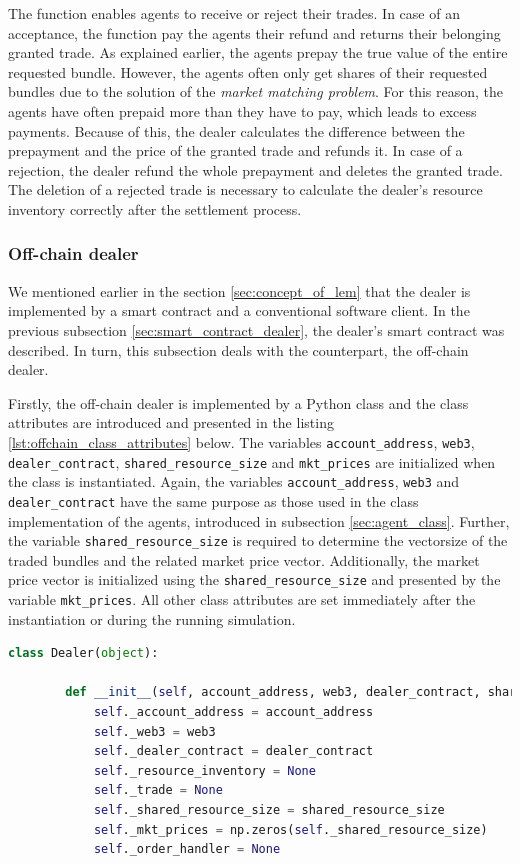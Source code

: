 The function enables agents to receive or reject their trades. 
In case of an acceptance, the function pay the agents their refund
and returns their belonging granted trade.
As explained earlier, the agents prepay the true value of the entire requested bundle.
However, the agents often only get shares of their requested bundles due to the solution of the 
\textit{market matching problem}.
For this reason, the agents have often prepaid more than they have to pay, which leads to 
excess payments. Because of this, the dealer calculates the difference between the prepayment 
and the price of the granted trade and refunds it.
In case of a rejection, the dealer refund the whole prepayment and deletes the granted trade.
The deletion of a rejected trade is necessary to calculate the dealer's resource inventory correctly
after the settlement process.


\subsubsection{Off-chain dealer}
\label{sec:off_chain_component}
We mentioned earlier in the section \ref{sec:concept_of_lem} that the 
dealer is implemented by a smart contract and a conventional software client.
In the previous subsection \ref{sec:smart_contract_dealer}, the 
dealer's smart contract was described. In turn, 
this subsection deals with the counterpart, the off-chain dealer. 

Firstly, the off-chain dealer is implemented by a Python class and the 
class attributes are introduced and presented in the listing \ref{lst:offchain_class_attributes} below.
The variables \verb|account_address|, \verb|web3|, 
\verb|dealer_contract|, \verb|shared_resource_size| and \verb|mkt_prices| 
are initialized when the class is instantiated.
Again, the variables \verb|account_address|, \verb|web3| and 
\verb|dealer_contract| have the same purpose as those used in the class implementation of 
the agents, introduced in subsection \ref{sec:agent_class}.
Further, the variable \verb|shared_resource_size| is required to determine the vectorsize 
of the traded bundles and the related market price vector. 
Additionally, the market price vector is initialized using the \verb|shared_resource_size|
and presented by the variable \verb|mkt_prices|.
All other class attributes are set immediately after 
the instantiation or during the running simulation.

\begin{lstlisting}[float=htbp, label=lst:offchain_class_attributes, caption=Overview of the off-chain dealer's class attributes, language=Python]
    class Dealer(object):

        def __init__(self, account_address, web3, dealer_contract, shared_resource_size):
            self._account_address = account_address
            self._web3 = web3
            self._dealer_contract = dealer_contract
            self._resource_inventory = None
            self._trade = None
            self._shared_resource_size = shared_resource_size
            self._mkt_prices = np.zeros(self._shared_resource_size)
            self._order_handler = None
\end{lstlisting}

